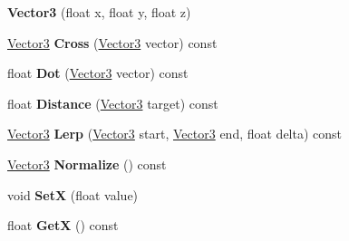 \begin{DoxyCompactItemize}
\item 
\hypertarget{struct_jade_1_1_math_1_1_vector3_a482c6c8728383806453aa1f8b767f2df}{}{\bfseries Vector3} (float x, float y, float z)\label{struct_jade_1_1_math_1_1_vector3_a482c6c8728383806453aa1f8b767f2df}

\item 
\hypertarget{struct_jade_1_1_math_1_1_vector3_a45525b5f36b4d7fdc8aca366a7526d8a}{}\hyperlink{struct_jade_1_1_math_1_1_vector3}{Vector3} {\bfseries Cross} (\hyperlink{struct_jade_1_1_math_1_1_vector3}{Vector3} vector) const \label{struct_jade_1_1_math_1_1_vector3_a45525b5f36b4d7fdc8aca366a7526d8a}

\item 
\hypertarget{struct_jade_1_1_math_1_1_vector3_ae1bac021a7124b01f2a27bf1f1eec6fe}{}float {\bfseries Dot} (\hyperlink{struct_jade_1_1_math_1_1_vector3}{Vector3} vector) const \label{struct_jade_1_1_math_1_1_vector3_ae1bac021a7124b01f2a27bf1f1eec6fe}

\item 
\hypertarget{struct_jade_1_1_math_1_1_vector3_af608af0c5cebb1204395dae33508fc28}{}float {\bfseries Distance} (\hyperlink{struct_jade_1_1_math_1_1_vector3}{Vector3} target) const \label{struct_jade_1_1_math_1_1_vector3_af608af0c5cebb1204395dae33508fc28}

\item 
\hypertarget{struct_jade_1_1_math_1_1_vector3_aa72152a483442f988b1ca949d3fa4451}{}\hyperlink{struct_jade_1_1_math_1_1_vector3}{Vector3} {\bfseries Lerp} (\hyperlink{struct_jade_1_1_math_1_1_vector3}{Vector3} start, \hyperlink{struct_jade_1_1_math_1_1_vector3}{Vector3} end, float delta) const \label{struct_jade_1_1_math_1_1_vector3_aa72152a483442f988b1ca949d3fa4451}

\item 
\hypertarget{struct_jade_1_1_math_1_1_vector3_aa4b4e9f0c65783d0464114cf448ec142}{}\hyperlink{struct_jade_1_1_math_1_1_vector3}{Vector3} {\bfseries Normalize} () const \label{struct_jade_1_1_math_1_1_vector3_aa4b4e9f0c65783d0464114cf448ec142}

\item 
\hypertarget{struct_jade_1_1_math_1_1_vector3_afebc895ea42bc43682c884bd1f1c1bc7}{}void {\bfseries Set\+X} (float value)\label{struct_jade_1_1_math_1_1_vector3_afebc895ea42bc43682c884bd1f1c1bc7}

\item 
\hypertarget{struct_jade_1_1_math_1_1_vector3_a3d07ab81ffd0eb1ec767c6fcf778fe1b}{}float {\bfseries Get\+X} () const \label{struct_jade_1_1_math_1_1_vector3_a3d07ab81ffd0eb1ec767c6fcf778fe1b}


\end{DoxyCompactItemize}
